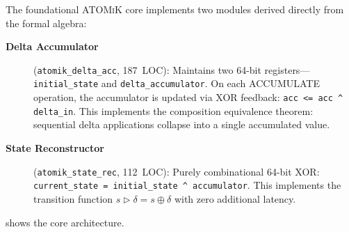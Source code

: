 \documentclass[11pt,letterpaper]{article}
\theoremstyle{plain}
\theoremstyle{definition}
\theoremstyle{remark}
\newcommand{\transition}{\triangleright}
\newcommand{\atomik}{\textsc{ATOMiK}}
\begin{document}
The foundational \atomik{} core implements two modules derived directly from the formal algebra:

\begin{description}
    \item[\textbf{Delta Accumulator}] (\texttt{atomik\_delta\_acc}, 187~LOC): Maintains two 64-bit registers---\texttt{initial\_state} and \texttt{delta\_accumulator}. On each ACCUMULATE operation, the accumulator is updated via XOR feedback: \texttt{acc <= acc \^{} delta\_in}. This implements the composition equivalence theorem: sequential delta applications collapse into a single accumulated value.

    \item[\textbf{State Reconstructor}] (\texttt{atomik\_state\_rec}, 112~LOC): Purely combinational 64-bit XOR: \texttt{current\_state = initial\_state \^{} accumulator}. This implements the transition function $s \transition \delta = s \oplus \delta$ with zero additional latency.
\end{description}

 shows the core architecture.
\end{document}
